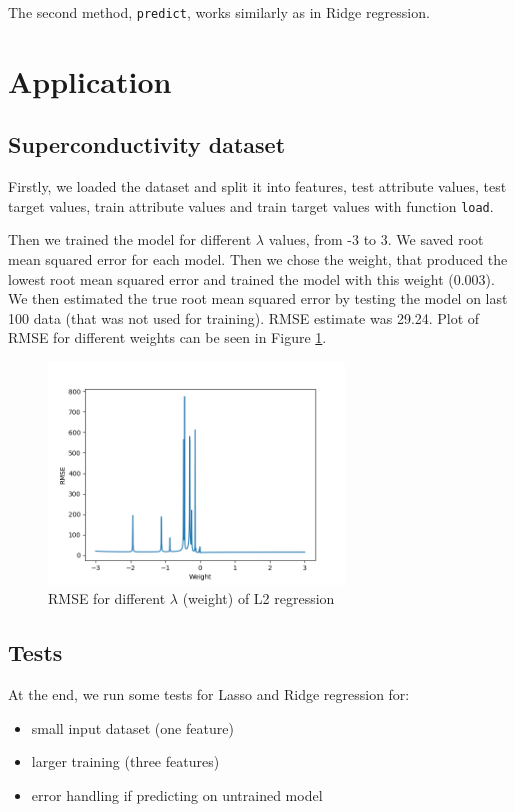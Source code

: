 \documentclass{article}
\begin{document}
The second method, \texttt{predict}, works similarly as in Ridge regression.

\section{Application}

\subsection{Superconductivity dataset}

Firstly, we loaded the dataset and split it into features, test attribute values, test target values, train attribute values and train target values with function \texttt{load}.

Then we trained the model for different $\lambda$ values, from -3 to 3. We saved root mean squared error for each model. Then we chose the weight, that produced the lowest root mean squared error and trained the model with this weight (0.003). We then estimated the true root mean squared error by testing the model on last 100 data (that was not used for training). RMSE estimate was 29.24. Plot of RMSE for different weights can be seen in Figure \ref{fig:f}.

\begin{figure}[!h]
    \centering
    \includegraphics[width=0.7\textwidth]{homework-03/plots/ridge.png}
    \caption{RMSE for different $\lambda$ (weight) of L2 regression}
    \label{fig:f}
\end{figure}

\subsection{Tests}

At the end, we run some tests for Lasso and Ridge regression for:
\begin{itemize}
    \item small input dataset (one feature)
    \item larger training (three features)
    \item error handling if predicting on untrained model
\end{itemize}

\printbibliography
\end{document}
